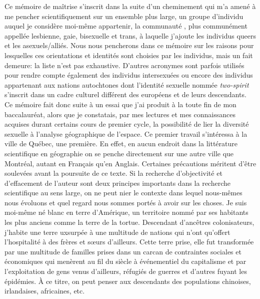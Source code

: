 Ce mémoire de maîtrise s'inscrit dans la suite d'un cheminement qui m'a amené à me pencher scientifiquement sur un ensemble plus large, un groupe d'individu auquel je considère moi-même appartenir, la communauté \lgbt{}, plus communément appellée lesbienne, gaie, bisexuelle et trans, à laquelle j'ajoute les individus queers et les asexuels/alliés. 
Nous nous pencherons dans ce mémoire sur les raisons pour lesquelles ces orientations et identités sont choisies par les individus, mais un fait demeure: la liste n'est pas exhaustive. 
D'autres acronymes sont parfois utilisés pour rendre compte également des individus intersexuées ou encore des individus appartenant aux nations autochtones dont l'identité sexuelle nommée \emph{two-spirit} s'inscrit dans un cadre culturel différent des européens et de leurs descendants. 
Ce mémoire fait donc suite à un essai que j'ai produit à la toute fin de mon baccalauréat, alors que je constatais, par mes lectures et mes connaissances acquises durant certains cours de premier cycle, la possibilité de lier la diversité sexuelle à l'analyse géographique de l'espace. 
Ce premier travail s'intéressa à la ville de Québec, une première. 
En effet, en aucun endroit dans la littérature scientifique en géographie on se penche directement sur une autre ville que Montréal, autant en Français qu'en Anglais.  
Certaines précautions méritent d'être soulevées avant la poursuite de ce texte. 
Si la recherche d'objectivité et d'effacement de l'auteur sont deux principes importants dans la recherche scientifique au sens large, on ne peut nier le contexte dans lequel nous-mêmes nous évoluons et quel regard nous sommes portés à avoir sur les choses. 
Je suis moi-même né blanc en terre d'Amérique, un territoire nommé par ses habitants les plus anciens comme la terre de la tortue. 
Descendant d'ancêtres colonisateurs, j'habite une terre uxsurpée à une multitude de nations qui n'ont qu'offert l'hospitalité à des frères et sœurs d'ailleurs. 
Cette terre prise, elle fut transformée par une multitude de familles prises dans un carcan de contraintes sociales et économiques qui menèrent au fil du siècle à événementiel du capitalisme et par l'exploitation de gens venus d'ailleurs, réfugiés de guerres et d'autres fuyant les épidémies. 
À ce titre, on peut penser aux descendants des populations chinoises, irlandaises, africaines, etc.  
